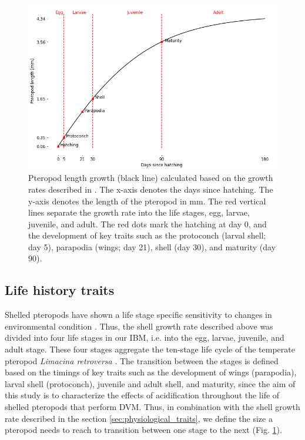 \begin{figure}[tbh!]
    \centering
    
        \includegraphics[scale=0.5]{images/Optimal_growth.png}
       
    
    \caption{Pteropod length growth (black line) calculated based on the growth rates described in \cite{Wang2017Lifecycle}. The x-axis denotes the days since hatching. The y-axis denotes the length of the pteropod in mm. The red vertical lines separate the growth rate into the life stages, egg, larvae, juvenile, and adult. The red dots mark the hatching at day 0, and the development of key traits such as the protoconch (larval shell; day 5), parapodia (wings; day 21), shell (day 30), and maturity (day 90).}
    \label{fig:optimal_growth}
\end{figure}


\subsection{Life history traits}\label{sec:life_history_traits}

Shelled pteropods have shown a  life stage specific sensitivity to changes in environmental condition \citep{Thabet2015Lifestages,Bednarsek2016CumulativeEffects}. Thus, the shell growth rate described above was divided into four life stages in our IBM, i.e. into the egg, larvae, juvenile, and adult stage. These four stages aggregate the ten-stage life cycle of the temperate pteropod \textit{Limacina retroversa} \citep{Howes2014Lab,Thabet2015Lifestages}. The transition between the stages is defined based on the timings of key traits such as the development of wings (parapodia), larval shell (protoconch), juvenile and adult shell, and maturity, since the aim of this study is to characterize the effects of acidification throughout the life of shelled pteropods that perform DVM. Thus, in combination with the shell growth rate described in the section \ref{sec:physiological_traits}, we define the size a pteropod needs to reach to transition between one stage to the next (Fig. \ref{fig:optimal_growth}).


